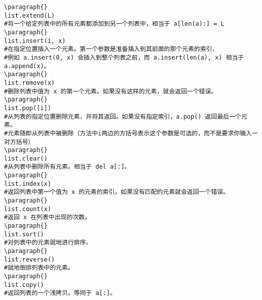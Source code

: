 \documentclass{article}
\begin{document}
\begin{CJK}{UTF8}{gbsn}
\begin{verbatim}
\paragraph{}
list.extend(L)
#将一个给定列表中的所有元素都添加到另一个列表中，相当于 a[len(a):] = L
\paragraph{}
list.insert(i, x)
#在指定位置插入一个元素。第一个参数是准备插入到其前面的那个元素的索引，
#例如 a.insert(0, x) 会插入到整个列表之前，而 a.insert(len(a), x) 相当于 a.append(x)。
\paragraph{}
list.remove(x)
#删除列表中值为 x 的第一个元素。如果没有这样的元素，就会返回一个错误。
\paragraph{}
list.pop([i])
#从列表的指定位置删除元素，并将其返回。如果没有指定索引，a.pop() 返回最后一个元素。
#元素随即从列表中被删除（方法中i两边的方括号表示这个参数是可选的，而不是要求你输入一对方括号）
\paragraph{}
list.clear()
#从列表中删除所有元素。相当于 del a[:]。
\paragraph{}
list.index(x)
#返回列表中第一个值为 x 的元素的索引。如果没有匹配的元素就会返回一个错误。
\paragraph{}
list.count(x)
#返回 x 在列表中出现的次数。
\paragraph{}
list.sort()
#对列表中的元素就地进行排序。
\paragraph{}
list.reverse()
#就地倒排列表中的元素。
\paragraph{}
list.copy()
#返回列表的一个浅拷贝。等同于 a[:]。
\end{verbatim}

\end{CJK}
\end{document}

